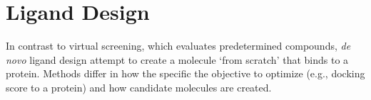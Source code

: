 \section{Ligand Design} 

In contrast to virtual screening, which evaluates predetermined compounds, \textit{de novo} ligand design attempt to create a molecule `from scratch' that binds to a protein.  Methods differ in how the specific the objective to optimize (e.g., docking score to a protein) and how candidate molecules are created.